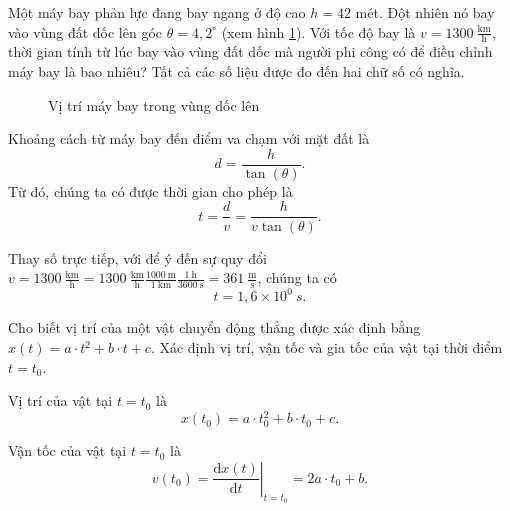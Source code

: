 \documentclass[a4paper, titlepage, openany]{book}
\newcounter{exercise}
\newcounter{solution}
\numberwithin{equation}{chapter}
\begin{document}
\exercise Một máy bay phản lực đang bay ngang ở độ cao $h=42$ mét. Đột nhiên nó bay vào vùng đất dốc lên góc $\theta=4{,}2^\circ$ (xem hình \ref{fig:may_bay_doc}). Với tốc độ bay là $v=1300\ \frac{\text{km}}{\text{h}}$, thời gian tính từ lúc bay vào vùng đất dốc mà người phi công có để điều chỉnh máy bay là bao nhiêu? Tất cả các số liệu được đo đến hai chữ số có nghĩa.

\begin{figure}[h]
   \centering
   \caption{Vị trí máy bay trong vùng dốc lên}
   \label{fig:may_bay_doc}
\end{figure}

\solution

Khoảng cách từ máy bay đến điểm va chạm với mặt đất là $$d=\frac{h}{\tan{(\theta)}}.$$ Từ đó, chúng ta có được thời gian cho phép là $$t=\frac{d}{v}=\frac{h}{v\tan{(\theta)}}.$$

Thay số trực tiếp, với để ý đến sự quy đổi $v=1300\ \frac{\text{km}}{\text{h}}=1300\ \frac{\text{km}}{\text{h}}\frac{1000\ \text{m}}{1\ \text{km}}\frac{1\ \text{h}}{3600\ \text{s}}=361\ \frac{\text{m}}{\text{s}}$, chúng ta có $$t=\boxed{1{,}6\times 10^0\ s}.$$

\exercise Cho biết vị trí của một vật chuyển động thẳng được xác định bằng $x(t) = a\cdot t^2+b\cdot t+c$. Xác định vị trí, vận tốc và gia tốc của vật tại thời điểm $t=t_0$.

\solution

Vị trí của vật tại $t=t_0$ là $$x\left(t_0\right)=\boxed{a\cdot t_0^2+b\cdot t_0+c}.$$

Vận tốc của vật tại $t=t_0$ là $$v\left(t_0\right)=\left.\frac{\mathrm{d}x(t)}{\mathrm{d}t}\right|_{t=t_0}=\boxed{2a\cdot t_0+b}.$$
\end{document}

